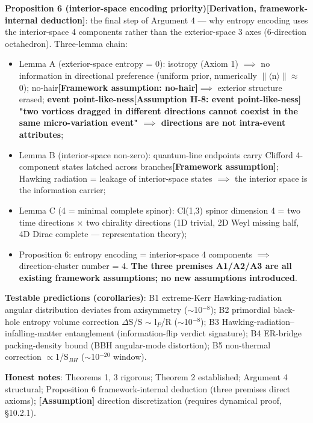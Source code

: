 \documentclass[12pt]{article}
\newcommand{\mtag}[1]{\textbf{[#1]}}
\newcommand{\up}[1]{\ensuremath{^{#1}}}
\newcommand{\down}[1]{\ensuremath{_{#1}}}
\begin{document}
\textbf{Proposition 6 (interior-space encoding priority)\mtag{Derivation, framework-internal deduction}}: the final step of Argument 4 --- why entropy encoding uses the interior-space 4 components rather than the exterior-space 3 axes (6-direction octahedron). Three-lemma chain:
\begin{itemize}
\item Lemma A (exterior-space entropy = 0): isotropy (Axiom 1) \ensuremath{\implies} no information in directional preference (uniform prior, numerically \ensuremath{\|}\ensuremath{\langle}n\ensuremath{\rangle}\ensuremath{\|}\ensuremath{\approx}0); no-hair\mtag{Framework assumption: no-hair}\ensuremath{\implies} exterior structure erased; \textbf{event point-like-ness\mtag{Assumption H-8: event point-like-ness} "two vortices dragged in different directions cannot coexist in the same micro-variation event" \ensuremath{\implies} directions are not intra-event attributes};
\item Lemma B (interior-space non-zero): quantum-line endpoints carry Clifford 4-component states latched across branches\mtag{Framework assumption}; Hawking radiation = leakage of interior-space states \ensuremath{\implies} the interior space is the information carrier;
\item Lemma C (4 = minimal complete spinor): Cl(1,3) spinor dimension 4 = two time directions \ensuremath{\times} two chirality directions (1D trivial, 2D Weyl missing half, 4D Dirac complete --- representation theory);
\item Proposition 6: entropy encoding = interior-space 4 components \ensuremath{\implies} direction-cluster number = 4. \textbf{The three premises A1/A2/A3 are all existing framework assumptions; no new assumptions introduced}.
\end{itemize}

\textbf{Testable predictions (corollaries)}: B1 extreme-Kerr Hawking-radiation angular distribution deviates from axisymmetry (\ensuremath{\sim}10\up{-8}); B2 primordial black-hole entropy volume correction \ensuremath{\Delta}S/S \ensuremath{\sim} l\down{P}/R (\ensuremath{\sim}10\up{-8}); B3 Hawking-radiation--infalling-matter entanglement (information-flip verdict signature); B4 ER-bridge packing-density bound (BBH angular-mode distortion); B5 non-thermal correction \ensuremath{\propto}1/S\down{BH} (\ensuremath{\sim}10\up{-20} window).

\textbf{Honest notes}: Theorems 1, 3 rigorous; Theorem 2 established; Argument 4 structural; Proposition 6 framework-internal deduction (three premises direct axioms); \mtag{Assumption} direction discretization (requires dynamical proof, \S{}10.2.1).
\end{document}
